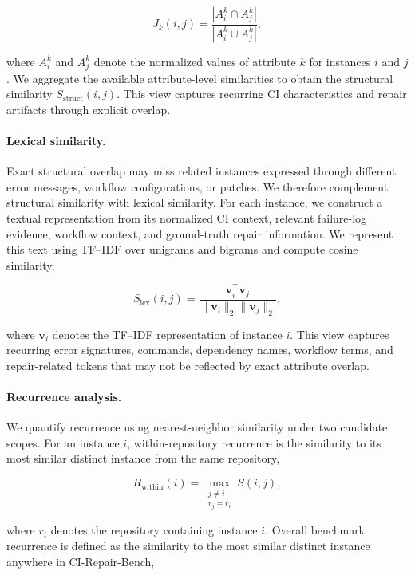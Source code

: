 \begin{equation}
J_k(i,j)
=
\frac{|A_i^k \cap A_j^k|}
{|A_i^k \cup A_j^k|},
\end{equation}

where $A_i^k$ and $A_j^k$ denote the normalized values of attribute
$k$ for instances $i$ and $j$. We aggregate the available
attribute-level similarities to obtain the structural similarity
$S_{\mathrm{struct}}(i,j)$. This view captures recurring CI
characteristics and repair artifacts through explicit overlap.

\paragraph{Lexical similarity.}
Exact structural overlap may miss related instances expressed through
different error messages, workflow configurations, or patches. We
therefore complement structural similarity with lexical similarity.
For each instance, we construct a textual representation from its
normalized CI context, relevant failure-log evidence, workflow context,
and ground-truth repair information. We represent this text using
TF--IDF over unigrams and bigrams and compute cosine similarity,

\begin{equation}
S_{\mathrm{lex}}(i,j)
=
\frac{\mathbf{v}_i^\top \mathbf{v}_j}
{\|\mathbf{v}_i\|_2\|\mathbf{v}_j\|_2},
\end{equation}

where $\mathbf{v}_i$ denotes the TF--IDF representation of instance
$i$. This view captures recurring error signatures, commands,
dependency names, workflow terms, and repair-related tokens that may
not be reflected by exact attribute overlap.

\paragraph{Recurrence analysis.}
We quantify recurrence using nearest-neighbor similarity under two
candidate scopes. For an instance $i$, within-repository recurrence is
the similarity to its most similar distinct instance from the same
repository,

\begin{equation}
R_{\mathrm{within}}(i)
=
\max_{\substack{j \neq i \\ r_j = r_i}}
S(i,j),
\end{equation}

where $r_i$ denotes the repository containing instance $i$. Overall
benchmark recurrence is defined as the similarity to the most similar
distinct instance anywhere in CI-Repair-Bench,

